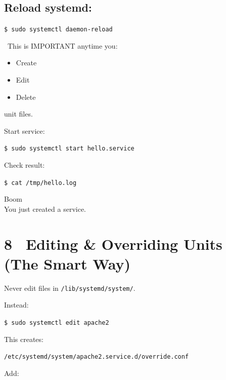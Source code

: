 \documentclass[12pt]{article}
\newcommand{\warningicon}{\faExclamationTriangle}
\begin{document}
\subsection*{Reload systemd:}

\begin{highlightbox}
\texttt{\$ sudo systemctl daemon-reload}
\end{highlightbox}

\begin{warningbox}
\warningicon\ This is IMPORTANT anytime you:
\begin{itemize}
    \item Create
    \item Edit
    \item Delete
\end{itemize}
unit files.
\end{warningbox}

Start service:

\begin{highlightbox}
\texttt{\$ sudo systemctl start hello.service}
\end{highlightbox}

Check result:

\begin{highlightbox}
\texttt{\$ cat /tmp/hello.log}
\end{highlightbox}

\begin{infobox}
Boom \faBolt\\
You just created a service.
\end{infobox}

\section*{8 \faEdit\ Editing \& Overriding Units (The Smart Way)}

Never edit files in \texttt{/lib/systemd/system/}.

Instead:

\begin{highlightbox}
\texttt{\$ sudo systemctl edit apache2}
\end{highlightbox}

This creates:

\begin{highlightbox}
\texttt{/etc/systemd/system/apache2.service.d/override.conf}
\end{highlightbox}

Add:
\end{document}
